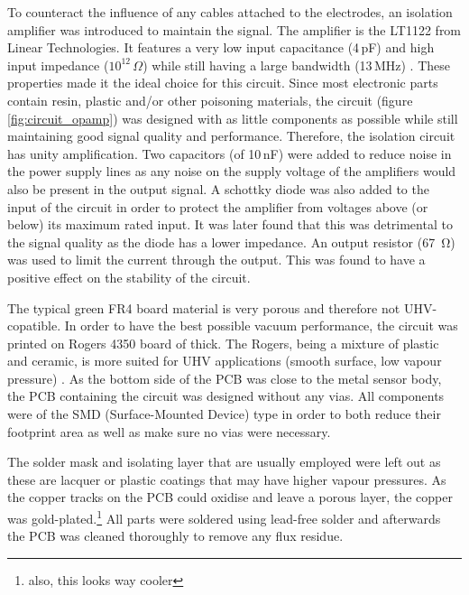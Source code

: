 To counteract the influence of any cables attached to the electrodes, an isolation amplifier was introduced to maintain the signal.
The amplifier is the LT1122 from Linear Technologies. It features a very low input capacitance (4\,pF) and high input impedance ($10^{12}\,\Omega$) while still having a large bandwidth (13\,MHz) \cite{LT1122}. These properties made it the ideal choice for this circuit.
Since most electronic parts contain resin, plastic and/or other poisoning materials, the circuit (figure \ref{fig:circuit_opamp}) was designed with as little components as possible while still maintaining good signal quality and performance. Therefore, the isolation circuit has unity amplification. %
Two capacitors (of 10\,nF) were added to reduce noise in the power supply lines as any noise on the supply voltage of the amplifiers would also be present in the output signal. A schottky diode was also added to the input of the circuit in order to protect the amplifier from voltages above (or below) its maximum rated input. It was later found that this was detrimental to the signal quality as the diode has a lower impedance. An output resistor (\SI{67}{\ohm}) was used to limit the current through the output. This was found to have a positive effect on the stability of the circuit.

The typical green FR4 board material is very porous and therefore not UHV-copatible. In order to have the best possible vacuum performance, the circuit was printed on Rogers 4350 board of  thick. The Rogers, being a mixture of plastic and ceramic, is more suited for UHV applications (smooth surface, low vapour pressure) .
As the bottom side of the PCB was close to the metal sensor body, the PCB containing the circuit was designed without any vias. All components were of the SMD (Surface-Mounted Device) type in order to both reduce their footprint area as well as make sure no vias were necessary.

The solder mask and isolating layer that are usually employed were left out as these are lacquer or plastic coatings that may have higher vapour pressures.
As the copper tracks on the PCB could oxidise and leave a porous layer, the copper was gold-plated.\footnote{also, this looks way cooler}
All parts were soldered using lead-free solder and afterwards the PCB was cleaned thoroughly to remove any flux residue.

